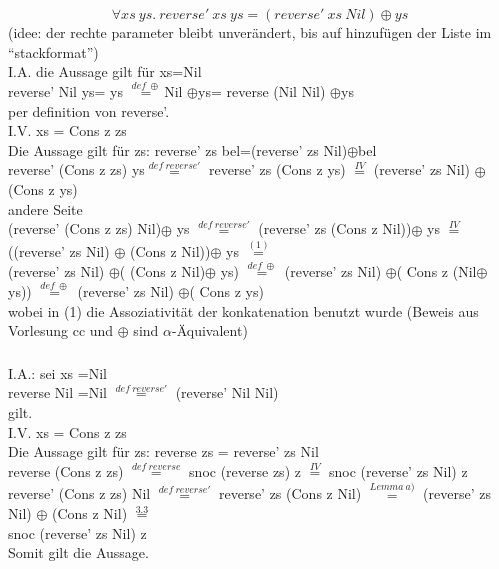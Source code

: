 \documentclass{article}
\theoremstyle{definition}
\begin{document}
	\subsubsection{}
	\[\forall xs\ ys.\ reverse'\ xs \ ys =(reverse'\ xs\ Nil)\oplus ys\]
	(idee: der rechte parameter bleibt unverändert, bis auf hinzufügen der Liste im ``stackformat'')\\
	I.A. die Aussage gilt für xs=Nil\\
	reverse' Nil  ys= ys $\stackrel{def\ \oplus}{=}$Nil $\oplus $ys= reverse (Nil Nil) $\oplus $ys\\
	per definition von reverse'.\\
	I.V. xs = Cons z zs\\
	Die Aussage gilt für zs: reverse' zs bel=(reverse' zs Nil)$\oplus$bel\\
	reverse' (Cons z zs)  ys$\stackrel{def\ reverse'}{ = }$ reverse' zs (Cons z ys) $\stackrel{IV}{=}$ (reverse' zs Nil) $\oplus$ (Cons z ys)\\
	andere Seite\\
	(reverse' (Cons z zs) Nil)$\oplus$ ys $\stackrel{def\ reverse'}{=}$ (reverse'  zs (Cons z Nil))$\oplus$ ys $\stackrel{IV}{=}$ ((reverse' zs Nil) $\oplus$ (Cons z Nil))$\oplus$ ys $\stackrel{(1)}{=} $\\
	(reverse' zs Nil) $\oplus$( (Cons z Nil)$\oplus$ ys) $\stackrel{def\ \oplus}{=}$ (reverse' zs Nil) $\oplus$( Cons z (Nil$\oplus$ ys)) $\stackrel{def\ \oplus}{=}$ (reverse' zs Nil) $\oplus$( Cons z ys)\\
	wobei in (1) die Assoziativität der konkatenation benutzt wurde (Beweis aus Vorlesung cc und $\oplus$ sind $\alpha$-Äquivalent)\\
	\subsubsection{}
	I.A.: sei xs =Nil\\
	reverse Nil =Nil $\stackrel{def\ reverse'}{=}$ (reverse' Nil Nil)\\
	gilt.\\
	I.V. xs = Cons z zs\\
	Die Aussage gilt für zs: reverse zs = reverse' zs Nil\\
	reverse (Cons z zs) $\stackrel{def\ reverse}{=}$ snoc (reverse zs) z $\stackrel{IV}{=}$ snoc (reverse' zs Nil) z\\
	reverse' (Cons z zs) Nil $\stackrel{def\ reverse'}{=}$ reverse' zs (Cons z Nil) $\stackrel{Lemma\ a)}{=}$ (reverse' zs Nil) $\oplus$ (Cons z Nil) $\stackrel{3.3}{=}$\\
	snoc (reverse' zs Nil) z\\
	Somit gilt die Aussage.\\
\end{document}
